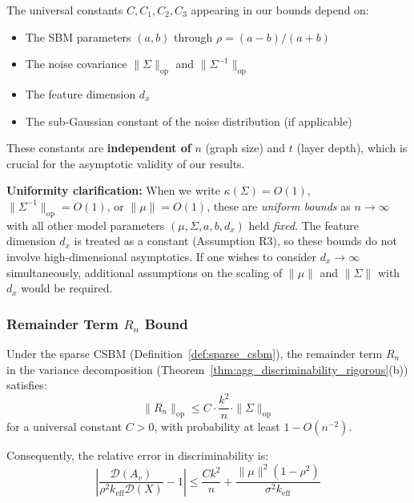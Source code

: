 \begin{remark}
\label{rem:constant_dependencies}
The universal constants $C, C_1, C_2, C_3$ appearing in our bounds depend on:
\begin{itemize}
    \item The SBM parameters $(a, b)$ through $\rho = (a-b)/(a+b)$
    \item The noise covariance $\|\Sigma\|_{\mathrm{op}}$ and $\|\Sigma^{-1}\|_{\mathrm{op}}$
    \item The feature dimension $d_x$
    \item The sub-Gaussian constant of the noise distribution (if applicable)
\end{itemize}
These constants are \textbf{independent of} $n$ (graph size) and $t$ (layer depth), which is crucial for the asymptotic validity of our results.

\textbf{Uniformity clarification:} When we write $\kappa(\Sigma) = O(1)$, $\|\Sigma^{-1}\|_{\mathrm{op}} = O(1)$, or $\|\mu\| = O(1)$, these are \textit{uniform bounds} as $n \to \infty$ with all other model parameters $(\mu, \Sigma, a, b, d_x)$ held \textit{fixed}. The feature dimension $d_x$ is treated as a constant (Assumption R3), so these bounds do not involve high-dimensional asymptotics. If one wishes to consider $d_x \to \infty$ simultaneously, additional assumptions on the scaling of $\|\mu\|$ and $\|\Sigma\|$ with $d_x$ would be required.
\end{remark}

\subsubsection{Remainder Term $R_n$ Bound}

\begin{lemma}
\label{lem:R_n_bound}
Under the sparse CSBM (Definition~\ref{def:sparse_csbm}), the remainder term $R_n$ in the variance decomposition (Theorem~\ref{thm:agg_discriminability_rigorous}(b)) satisfies:
\begin{equation}
    \|R_n\|_{\mathrm{op}} \leq C \cdot \frac{k^2}{n} \cdot \|\Sigma\|_{\mathrm{op}}
\end{equation}
for a universal constant $C > 0$, with probability at least $1 - O(n^{-2})$.

Consequently, the relative error in discriminability is:
\begin{equation}
    \left|\frac{\mathcal{D}(A_v)}{\rho^2 k_{\mathrm{eff}} \mathcal{D}(X)} - 1\right| \leq \frac{C k^2}{n} + \frac{\|\mu\|^2 (1-\rho^2)}{\sigma^2 k_{\mathrm{eff}}}
\end{equation}
\end{lemma}

